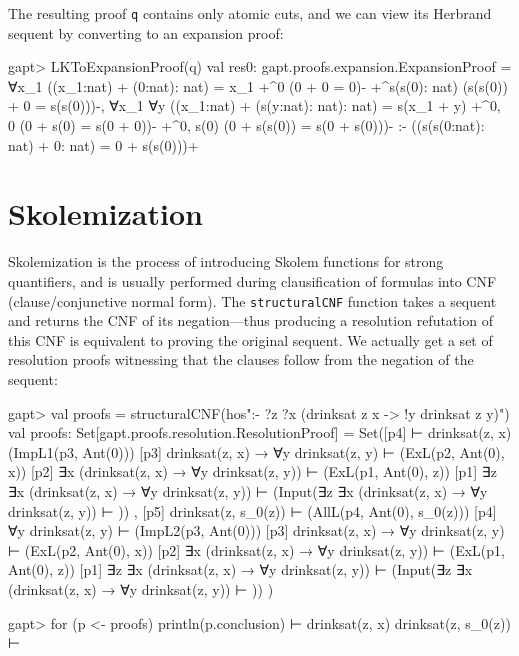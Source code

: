 \documentclass[a4paper,11pt]{book}
\begin{document}
The resulting proof \texttt{q} contains only atomic cuts, and we can view its Herbrand
sequent by converting to an expansion proof:

\begin{clilisting}
  gapt> LKToExpansionProof(q)
  val res0: gapt.proofs.expansion.ExpansionProof = ∀x_1 ((x_1:nat) + (0:nat): nat) = x_1
  +^{0} (0 + 0 = 0)-
  +^{s(s(0): nat)} (s(s(0)) + 0 = s(s(0)))-,
  ∀x_1 ∀y ((x_1:nat) + (s(y:nat): nat): nat) = s(x_1 + y)
  +^{0, 0} (0 + s(0) = s(0 + 0))-
  +^{0, s(0)} (0 + s(s(0)) = s(0 + s(0)))-
  :-
  ((s(s(0:nat): nat) + 0: nat) = 0 + s(s(0)))+

\end{clilisting}

\section{Skolemization}\label{secskolem}

Skolemization is the process of introducing Skolem functions for strong
quantifiers, and is usually performed during clausification of formulas into
CNF (clause/conjunctive normal form).  The \texttt{structuralCNF} function
takes a sequent and returns the CNF of its negation---thus producing a
resolution refutation of this CNF is equivalent to proving the original
sequent.  We actually get a set of resolution proofs witnessing that the
clauses follow from the negation of the sequent:
\begin{clilisting}
  gapt> val proofs = structuralCNF(hos":- ?z ?x (drinksat z x -> !y drinksat z y)")
  val proofs: Set[gapt.proofs.resolution.ResolutionProof] = Set([p4]  ⊢ drinksat(z, x)   (ImpL1(p3, Ant(0)))
  [p3] drinksat(z, x) → ∀y drinksat(z, y) ⊢    (ExL(p2, Ant(0), x))
  [p2] ∃x (drinksat(z, x) → ∀y drinksat(z, y)) ⊢    (ExL(p1, Ant(0), z))
  [p1] ∃z ∃x (drinksat(z, x) → ∀y drinksat(z, y)) ⊢    (Input(∃z ∃x (drinksat(z, x) → ∀y drinksat(z, y)) ⊢ ))
  , [p5] drinksat(z, s_0(z)) ⊢    (AllL(p4, Ant(0), s_0(z)))
  [p4] ∀y drinksat(z, y) ⊢    (ImpL2(p3, Ant(0)))
  [p3] drinksat(z, x) → ∀y drinksat(z, y) ⊢    (ExL(p2, Ant(0), x))
  [p2] ∃x (drinksat(z, x) → ∀y drinksat(z, y)) ⊢    (ExL(p1, Ant(0), z))
  [p1] ∃z ∃x (drinksat(z, x) → ∀y drinksat(z, y)) ⊢    (Input(∃z ∃x (drinksat(z, x) → ∀y drinksat(z, y)) ⊢ ))
  )

  gapt> for (p <- proofs) println(p.conclusion)
  ⊢ drinksat(z, x)
  drinksat(z, s_0(z)) ⊢

\end{clilisting}
\end{document}
